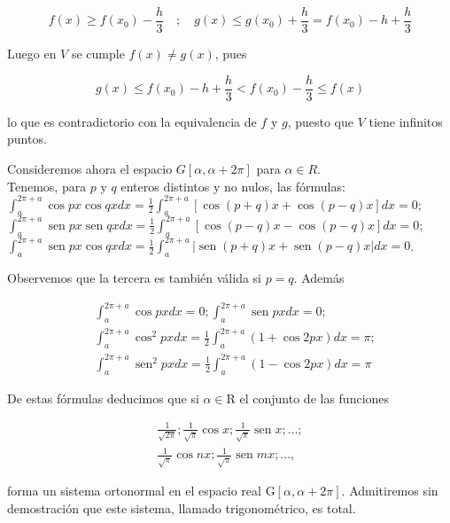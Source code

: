 \documentclass[10pt]{article}
\theoremstyle{plain}
\theoremstyle{definition}
\theoremstyle{remark}
\begin{document}
$$
f(x) \geqslant f\left(x_{0}\right)-\frac{h}{3} \quad ; \quad g(x) \leqslant g\left(x_{0}\right)+\frac{h}{3}=f\left(x_{0}\right)-h+\frac{h}{3}
$$

Luego en $V$ se cumple $f(x) \neq g(x)$, pues

$$
g(x) \leqslant f\left(x_{0}\right)-h+\frac{h}{3}<f\left(x_{0}\right)-\frac{h}{3} \leqslant f(x)
$$

lo que es contradictorio con la equivalencia de $f$ y $g$, puesto que $V$ tiene infinitos puntos.

Consideremos ahora el espacio $G[\alpha, \alpha+2 \pi]$ para $\alpha \in R$.\\
Tenemos, para $p$ y $q$ enteros distintos y no nulos, las fórmulas:\\
$\int_{a}^{2 \pi+a} \cos p x \cos q x d x=\frac{1}{2} \int_{a}^{2 \pi+a}[\cos (p+q) x+\cos (p-q) x] d x=0 ;$\\
$\int_{a}^{2 \pi+a} \operatorname{sen} p x \operatorname{sen} q x d x=\frac{1}{2} \int_{a}^{2 \pi+a}[\cos (p-q) x-\cos (p-q) x] d x=0 ;$\\
$\int_{a}^{2 \pi+a} \operatorname{sen} p x \cos q x d x=\frac{1}{2} \int_{a}^{2 \pi+a}|\operatorname{sen}(p+q) x+\operatorname{sen}(p-q) x| d x=0$.

Observemos que la tercera es también válida si $p=q$. Además

$$
\begin{aligned}
& \int_{a}^{2 \pi+a} \cos p x d x=0 ; \int_{a}^{2 \pi+a} \operatorname{sen} p x d x=0 ; \\
& \int_{a}^{2 \pi+a} \cos ^{2} p x d x=\frac{1}{2} \int_{a}^{2 \pi+a}(1+\cos 2 p x) d x=\pi ; \\
& \int_{a}^{2 \pi+a} \operatorname{sen}^{2} p x d x=\frac{1}{2} \int_{a}^{2 \pi+a}(1-\cos 2 p x) d x=\pi
\end{aligned}
$$

De estas fórmulas deducimos que si $\alpha \in \mathrm{R}$ el conjunto de las funciones

\[
\begin{array}{r}
\frac{1}{\sqrt{2 \pi}} ; \frac{1}{\sqrt{\pi}} \cos x ; \frac{1}{\sqrt{\pi}} \operatorname{sen} x ; \ldots ; \\
\frac{1}{\sqrt{\pi}} \cos n x ; \frac{1}{\sqrt{\pi}} \operatorname{sen} m x ; \ldots, \tag{3-15}
\end{array}
\]

forma un sistema ortonormal en el espacio real $\mathrm{G}[\alpha, \alpha+2 \pi]$. Admitiremos sin demostración que este sistema, llamado trigonométrico, es total.
\end{document}
